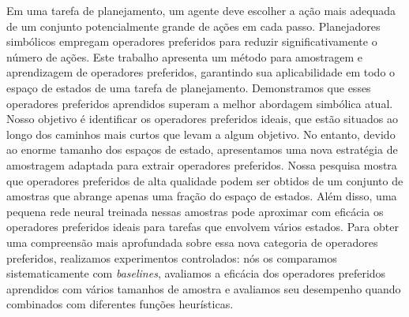 \documentclass[ppgc,diss,english]{iiufrgs}
\begin{document}
\begin{translatedabstract}
Em uma tarefa de planejamento, um agente deve escolher a ação mais adequada de um conjunto potencialmente grande de ações em cada passo. Planejadores simbólicos empregam operadores preferidos para reduzir significativamente o número de ações. Este trabalho apresenta um método para amostragem e aprendizagem de operadores preferidos, garantindo sua aplicabilidade em todo o espaço de estados de uma tarefa de planejamento. Demonstramos que esses operadores preferidos aprendidos superam a melhor abordagem simbólica atual.
Nosso objetivo é identificar os operadores preferidos ideais, que estão situados ao longo dos caminhos mais curtos que levam a algum objetivo. No entanto, devido ao enorme tamanho dos espaços de estado, apresentamos uma nova estratégia de amostragem adaptada para extrair operadores preferidos. Nossa pesquisa mostra que operadores preferidos de alta qualidade podem ser obtidos de um conjunto de amostras que abrange apenas uma fração do espaço de estados. Além disso, uma pequena rede neural treinada nessas amostras pode aproximar com eficácia os operadores preferidos ideais para tarefas que envolvem vários estados.
Para obter uma compreensão mais aprofundada sobre essa nova categoria de operadores preferidos, realizamos experimentos controlados: nós os comparamos sistematicamente com \textit{baselines}, avaliamos a eficácia dos operadores preferidos aprendidos com vários tamanhos de amostra e avaliamos seu desempenho quando combinados com diferentes funções heurísticas.
\end{translatedabstract}
\end{document}
